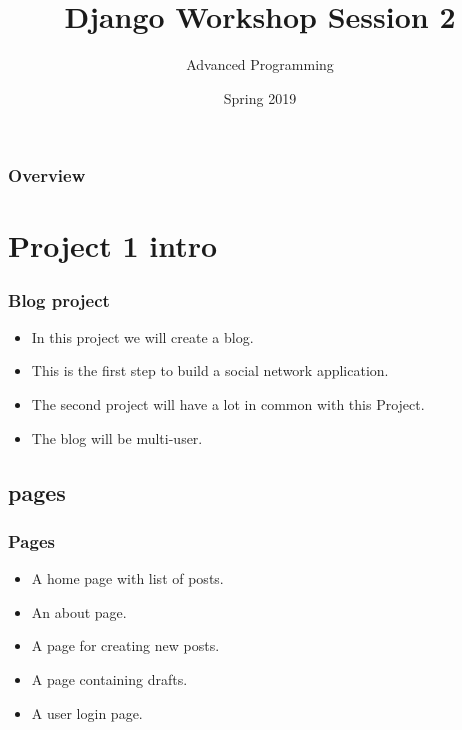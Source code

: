 \documentclass{beamer}
\title[Django Workshop]{Django Workshop Session 2} %
\author{Advanced Programming} %
\institute[AUT] %
{
	Amirkabir University of Technology\\ %
	\medskip
	\textit{} %
}
\date{Spring 2019} %
\begin{document}
	
	\begin{frame}
		\titlepage %
	\end{frame}

	\begin{frame}
	\frametitle{Overview} %
	\tableofcontents %
	\end{frame}


\section{Project 1 intro}
\begin{frame}
\frametitle{Blog project}
	\begin{itemize}
		\item In this project we will create a blog.
		\item This is the first step to build a social network application.
		\item The second project will have a lot in common with this Project.
		\item The blog will be multi-user.
	\end{itemize}
\end{frame}

\subsection{pages}
\begin{frame}
\frametitle{Pages}
\begin{itemize}
	\item A home page with list of posts.
	\item An about page.
	\item A page for creating new posts.
	\item A page containing drafts.
	\item A user login page.
\end{itemize}
\end{frame}
\end{document}
